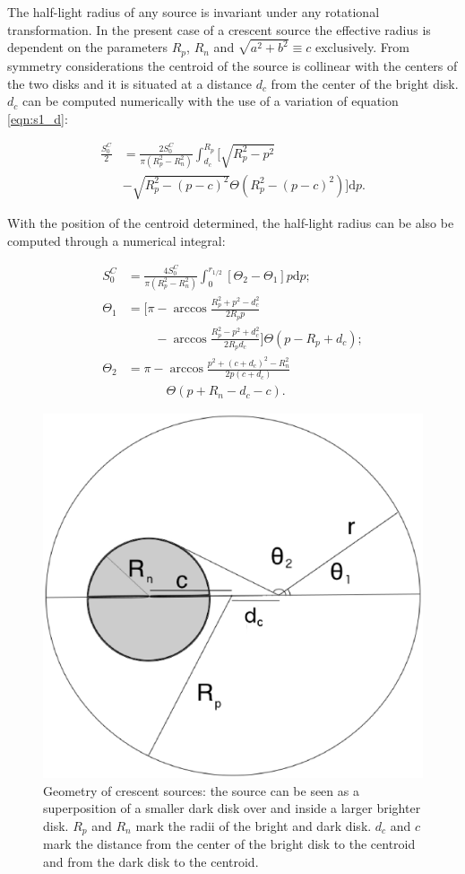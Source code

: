 \documentclass[usenatbib]{mn2e}
\begin{document}
The half-light radius of any source is invariant under any rotational
transformation.  In the present case of a crescent source the
effective radius is dependent on the parameters $R_p$, $R_n$ and
$\sqrt{a^2+b^2}\equiv c $ exclusively. From symmetry considerations
the centroid of the source is collinear with the centers of the two
disks and it is situated at a distance $d_c$ from the center of the
bright disk. $d_c$ can be computed numerically with the use of a
variation of equation \ref{eqn:s1_d}:

\begin{equation}
\begin{aligned}
\frac{S_0^C}{2} & = \frac{2 S_0^C}{\pi \left(R_p^2-R_n^2 \right)} \int_{d_c}^{R_p} \bigg[ \sqrt{R_p^2 - p^2} \\ 
        & - \sqrt{R_p^2 - \left(p-c\right)^2} \Theta \left(R_p^2 - \left(p-c\right)^2 \right) \bigg] \mathrm{d}p. 
\end{aligned}
\end{equation}   

With the position of the centroid determined, the half-light radius
can be also be computed through a numerical integral:
 
\begin{equation}
\begin{aligned}
S_0^C &=  \frac{4S_0^C}{\pi \left(R_p^2-R_n^2 \right)} \int_{0}^{r_{1/2}} \left[ \Theta_2  - \Theta_1  \right] p \mathrm{d}p; \\
\Theta_1 &= \bigg[ \pi - \arccos \frac{R_p^2 + p^2 -d_c^2}{2 R_p p} \\
         & \phantom{= \bigg[ \pi} - \arccos \frac{R_p^2 - p^2 + d_c^2}{2 R_p d_c}
            \bigg] \Theta \left( p - R_p + d_c \right); \\
\Theta_2 &=  \pi - \arccos \frac{ p^2  + (c+d_c)^2 - R_n^2}
                                {2 p \left(c + d_c \right)} \\
         & \phantom{= \pi - } \Theta \left( p + R_n - d_c -c \right). 
\end{aligned}
\end{equation}

\begin{figure}
\includegraphics[width = .49\textwidth]{figures/figure_rhalf2.eps}
\caption{\label{fig:geom_crescent} Geometry of crescent sources: the source can be seen as a superposition
 of a smaller dark disk over and inside a larger brighter disk. $R_p$ and $R_n$ mark the radii of the 
bright and dark disk. $d_c$ and $c$ mark the distance from the center of the bright disk to the 
centroid and from the dark disk to the centroid.  }
\end{figure}
\end{document}
